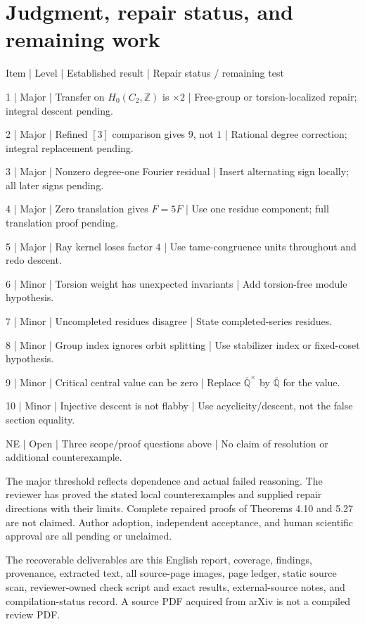 \documentclass[10pt]{article}
\begin{document}
\section*{Judgment, repair status, and remaining work}
Item | Level | Established result | Repair status / remaining test\par
1 | Major | Transfer on \(H_0(C_2,\mathbb Z)\) is \(\times2\) | Free-group or torsion-localized repair; integral descent pending.\par
2 | Major | Refined \([3]\) comparison gives \(9\), not \(1\) | Rational degree correction; integral replacement pending.\par
3 | Major | Nonzero degree-one Fourier residual | Insert alternating sign locally; all later signs pending.\par
4 | Major | Zero translation gives \(F=5F\) | Use one residue component; full translation proof pending.\par
5 | Major | Ray kernel loses factor \(4\) | Use tame-congruence units throughout and redo descent.\par
6 | Minor | Torsion weight has unexpected invariants | Add torsion-free module hypothesis.\par
7 | Minor | Uncompleted residues disagree | State completed-series residues.\par
8 | Minor | Group index ignores orbit splitting | Use stabilizer index or fixed-coset hypothesis.\par
9 | Minor | Critical central value can be zero | Replace \(\overline{\mathbb Q}^\times\) by \(\overline{\mathbb Q}\) for the value.\par
10 | Minor | Injective descent is not flabby | Use acyclicity/descent, not the false section equality.\par
NE | Open | Three scope/proof questions above | No claim of resolution or additional counterexample.\par
The major threshold reflects dependence and actual failed reasoning. The reviewer has proved the stated local counterexamples and supplied repair directions with their limits. Complete repaired proofs of Theorems 4.10 and 5.27 are not claimed. Author adoption, independent acceptance, and human scientific approval are all pending or unclaimed.\par
The recoverable deliverables are this English report, coverage, findings, provenance, extracted text, all source-page images, page ledger, static source scan, reviewer-owned check script and exact results, external-source notes, and compilation-status record. A source PDF acquired from arXiv is not a compiled review PDF.\par
\end{document}
